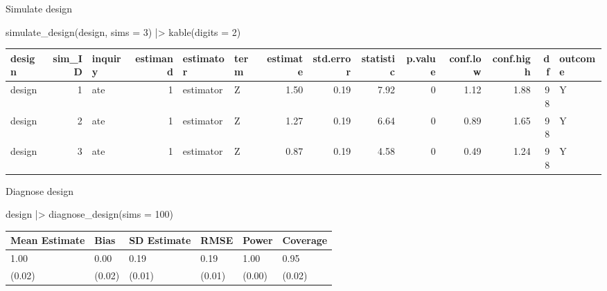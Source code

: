 \documentclass[
  11pt,
  ignorenonframetext,
]{beamer}
\newenvironment{Shaded}{\begin{snugshade}}{\end{snugshade}}
\newcommand{\AttributeTok}[1]{\textcolor[rgb]{0.40,0.45,0.13}{#1}}
\newcommand{\DecValTok}[1]{\textcolor[rgb]{0.68,0.00,0.00}{#1}}
\newcommand{\FunctionTok}[1]{\textcolor[rgb]{0.28,0.35,0.67}{#1}}
\newcommand{\NormalTok}[1]{\textcolor[rgb]{0.00,0.23,0.31}{#1}}
\newcommand{\SpecialCharTok}[1]{\textcolor[rgb]{0.37,0.37,0.37}{#1}}
\begin{document}
\begin{frame}[fragile]{Simulate design}
\protect\hypertarget{simulate-design}{}
\begin{Shaded}
\begin{Highlighting}[]
\FunctionTok{simulate\_design}\NormalTok{(design, }\AttributeTok{sims =} \DecValTok{3}\NormalTok{) }\SpecialCharTok{|\textgreater{}}
  \FunctionTok{kable}\NormalTok{(}\AttributeTok{digits =} \DecValTok{2}\NormalTok{)}
\end{Highlighting}
\end{Shaded}

\begin{tabular}{l|r|l|r|l|l|r|r|r|r|r|r|r|l}
\hline
design & sim\_ID & inquiry & estimand & estimator & term & estimate & std.error & statistic & p.value & conf.low & conf.high & df & outcome\\
\hline
design & 1 & ate & 1 & estimator & Z & 1.50 & 0.19 & 7.92 & 0 & 1.12 & 1.88 & 98 & Y\\
\hline
design & 2 & ate & 1 & estimator & Z & 1.27 & 0.19 & 6.64 & 0 & 0.89 & 1.65 & 98 & Y\\
\hline
design & 3 & ate & 1 & estimator & Z & 0.87 & 0.19 & 4.58 & 0 & 0.49 & 1.24 & 98 & Y\\
\hline
\end{tabular}
\end{frame}

\begin{frame}[fragile]{Diagnose design}
\protect\hypertarget{diagnose-design}{}
\begin{Shaded}
\begin{Highlighting}[]
\NormalTok{design }\SpecialCharTok{|\textgreater{}} 
  \FunctionTok{diagnose\_design}\NormalTok{(}\AttributeTok{sims =} \DecValTok{100}\NormalTok{) }
\end{Highlighting}
\end{Shaded}

\begin{tabular}{l|l|l|l|l|l}
\hline
Mean Estimate & Bias & SD Estimate & RMSE & Power & Coverage\\
\hline
1.00 & 0.00 & 0.19 & 0.19 & 1.00 & 0.95\\
\hline
(0.02) & (0.02) & (0.01) & (0.01) & (0.00) & (0.02)\\
\hline
\end{tabular}
\end{frame}
\end{document}
